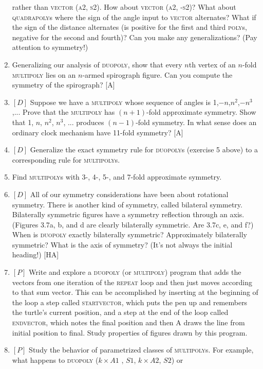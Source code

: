 \documentclass{book}
\begin{document}
\begin{enumerate}
rather than \textsc{vector (a2, s2)}. How about \textsc{vector (a2, -s2)}? What
about \textsc{quadrapoly}s where the sign of the angle input to \textsc{vector} alternates? What if the sign of the distance alternates (is positive for the first
and third \textsc{poly}s, negative for the second and fourth)? Can you make
any generalizations? (Pay attention to symmetry!)
\item Generalizing our analysis of \textsc{duopoly}, show that every $n$th vertex
of an $n$-fold \textsc{multipoly} lies on an $n$-armed spirograph figure. Can you
compute the symmetry of the spirograph? [A]
\item $[D]$ Suppose we have a \textsc{multipoly} whose sequence of angles is
1,$-n$,$n^2$,$-n^3$,... Prove that the \textsc{multipoly} has $(n + 1)$-fold approximate symmetry. 
Show that 1, $n$, $n^2$, $n^3$, ... produces $(n - 1)$-fold
symmetry. In what sense does an ordinary clock mechanism have 11-fold
symmetry? [A]
\item $[D]$ Generalize the exact symmetry rule for \textsc{duopoly}s (exercise 5
above) to a corresponding rule for \textsc{multipoly}s.
\item Find \textsc{multipoly}s with 3-, 4-, 5-, and 7-fold approximate symmetry.
\item $[D]$ All of our symmetry considerations have been about rotational
symmetry. There is another kind of symmetry, called bilateral symmetry. Bilaterally symmetric figures have a symmetry reflection through
an axis. (Figures 3.7a, b, and d are clearly bilaterally symmetric. Are
3.7c, e, and f?) When is \textsc{duopoly} exactly bilaterally symmetric? Approximately bilaterally symmetric? What is the axis of symmetry? (It's not
always the initial heading!) [HA]
\item $[P]$ Write and explore a \textsc{duopoly} (or \textsc{multipoly}) program that adds
the vectors from one iteration of the \textsc{repeat} loop and then just moves
according to that sum vector. This can be accomplished by inserting at
the beginning of the loop a step called \textsc{startvector}, which puts the pen
up and remembers the turtle's current position, and a step at the end
of the loop called \textsc{endvector}, which notes the final position and then
A draws the line from initial position to final. Study properties of figures
drawn by this program.
\item $[P]$ Study the behavior of parametrized classes of \textsc{multipoly}s.
For example, what happens to \textsc{duopoly} ($k \times A1$ , $S1$, $k \times A2$, $S2$) or

\end{enumerate}
\end{document}
